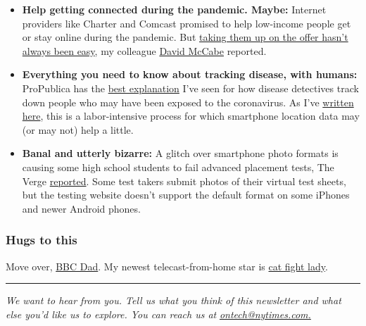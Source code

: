 \begin{itemize}
\item
  \textbf{Help getting connected during the pandemic. Maybe:} Internet
  providers like Charter and Comcast promised to help low-income people
  get or stay online during the pandemic. But
  \href{https://www.nytimes.com/2020/05/20/technology/coronavirus-broadband-discounts.html}{taking
  them up on the offer hasn't always been easy}, my colleague
  \href{https://www.nytimes.com/by/david-mccabe}{David McCabe} reported.
\item
  \textbf{Everything you need to know about tracking disease, with
  humans:} ProPublica has the
  \href{https://www.propublica.org/article/you-dont-need-invasive-tech-for-successful-contact-tracing-heres-how-it-works}{best
  explanation} I've seen for how disease detectives track down people
  who may have been exposed to the coronavirus. As I've
  \href{https://www.nytimes.com/2020/04/29/technology/coronavirus-contact-tracing-technology.html}{written
  here}, this is a labor-intensive process for which smartphone location
  data may (or may not) help a little.
\item
  \textbf{Banal and utterly bizarre:} A glitch over smartphone photo
  formats is causing some high school students to fail advanced
  placement tests, The Verge
  \href{https://www.theverge.com/2020/5/20/21262302/ap-test-fail-iphone-photos-glitch-email-college-board-jpeg-heic}{reported}.
  Some test takers submit photos of their virtual test sheets, but the
  testing website doesn't support the default format on some iPhones and
  newer Android phones.
\end{itemize}

\hypertarget{hugs-to-this}{%
\subsubsection{Hugs to this}\label{hugs-to-this}}

Move over, \href{https://www.youtube.com/watch?v=Mh4f9AYRCZY}{BBC Dad}.
My newest telecast-from-home star is
\href{https://twitter.com/ratemyskyperoom/status/1261684025502113794}{cat
fight lady}.

\begin{center}\rule{0.5\linewidth}{\linethickness}\end{center}

\emph{We want to hear from you. Tell us what you think of this
newsletter and what else you'd like us to explore. You can reach us at}
\href{mailto:ontech@nytimes.com?subject=On\%20Tech\%20Feedback}{\emph{ontech@nytimes.com.}}

